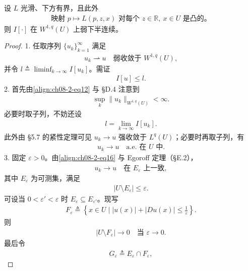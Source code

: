 \documentclass[../../main.tex]{subfiles}
\begin{document}
\begin{theorem}[弱下半连续性]\label{theorem:ch08-2-1-弱下半连续}
设 $L$ 光滑、下方有界，且此外
\begin{align*}
\text{映射 }p\mapsto L(p,z,x)\text{ 对每个 }z\in\mathbb{R},\ x\in U\text{ 是凸的。}
\end{align*}
则 $I[\cdot]$ 在 $W^{1,q}(U)$ 上弱下半连续。
\begin{proof}
1. 任取序列 $\{u_k\}_{k=1}^\infty$ 满足
\begin{align}
u_k\rightharpoonup u\quad\text{弱收敛于 }W^{1,q}(U),\label{align:ch08-2-eq12}
\end{align}
并令 $l\triangleq\liminf_{k\to\infty}I[u_k]$。需证
\begin{align}
I[u]\leqslant l.\label{align:ch08-2-eq13}
\end{align}
2. 首先由\eqref{align:ch08-2-eq12} 与 \S D.4 注意到
\begin{align}
\sup_k\|u_k\|_{W^{1,q}(U)}<\infty.\label{align:ch08-2-eq14}
\end{align}
必要时取子列，不妨还设
\begin{align}
l=\lim_{k\to\infty}I[u_k].\label{align:ch08-2-eq15}
\end{align}
此外由 \S5.7 的紧性定理可见 $u_k\to u$ 强收敛于 $L^q(U)$；必要时再取子列，有
\begin{align}
u_k\to u\quad\text{a.e. 在 }U\text{ 中}.\label{align:ch08-2-eq16}
\end{align}
3. 固定 $\varepsilon>0$。由\eqref{align:ch08-2-eq16} 与 Egoroff 定理（\S E.2），
\begin{align}
u_k\to u\quad\text{在 }E_\varepsilon\text{ 上一致},\label{align:ch08-2-eq17}
\end{align}
其中 $E_\varepsilon$ 为可测集，满足
\begin{align}
|U\setminus E_\varepsilon|\leqslant\varepsilon.\label{align:ch08-2-eq18}
\end{align}
可设当 $0<\varepsilon'<\varepsilon$ 时 $E_\varepsilon\subseteq E_{\varepsilon'}$。现写
\begin{align}
F_\varepsilon\triangleq\left\{x\in U\mid |u(x)|+|Du(x)|\leqslant\frac1\varepsilon\right\}.\label{align:ch08-2-eq19}
\end{align}
则
\begin{align}
|U\setminus F_\varepsilon|\to 0\quad\text{当 }\varepsilon\to 0.\label{align:ch08-2-eq20}
\end{align}
最后令
\begin{align}
G_\varepsilon\triangleq E_\varepsilon\cap F_\varepsilon,\label{align:ch08-2-eq21}

\end{align}
\end{proof}
\end{theorem}
\end{document}
